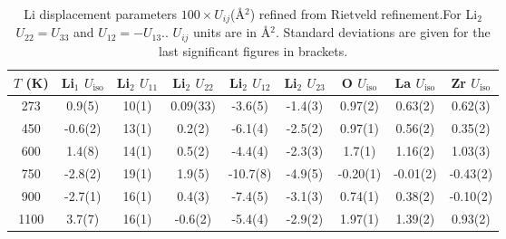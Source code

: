 \documentclass[twoside,twocolumn,9pt]{article}
\begin{document}
\begin{table}[t]
\centering
\caption{Li displacement parameters $100 \times U_{ij}$(\AA$^2$) refined from Rietveld refinement.For Li$_2$ $U_{22} = U_{33}$ and $U_{12} = - U_{13}.
$. $U_{ij}$ units are in \AA$^2$.
Standard deviations are given for the last significant figures in brackets. }
\label{tab:Li_displacement_parameters}
\begin{tabular}{ccccccccc}
\hline
\hline
$T$ (K) & Li$_1$ $U_\mathrm{iso}$  & Li$_2$ $U_{11}$ & Li$_2$ $U_{22}$ & Li$_2$ $U_{12}$ & Li$_2$ $U_{23}$  & O $U_\mathrm{iso}$  & La $U_\mathrm{iso}$  & Zr $U_\mathrm{iso}$\\
\hline
273     &  0.9(5)                  & 10(1)           & 0.09(33)        & -3.6(5)         & -1.4(3)          &  0.97(2)            &  0.63(2)             &  0.62(3)            \\
450     & -0.6(2)                  & 13(1)           & 0.2(2)          & -6.1(4)         & -2.5(2)          &  0.97(1)            &  0.56(2)             &  0.35(2)            \\
600     &  1.4(8)                  & 14(1)           & 0.5(2)          & -4.4(4)         & -2.3(3)          &  1.7(1)             &  1.16(2)             &  1.03(3)            \\
750     & -2.8(2)                  & 19(1)           & 1.9(5)          & -10.7(8)        & -4.9(5)          & -0.20(1)            & -0.01(2)             & -0.43(2)            \\
900     & -2.7(1)                  & 16(1)           & 0.4(3)          & -7.4(5)         & -3.1(3)          &  0.74(1)            &  0.38(2)             & -0.10(2)            \\
1100    &  3.7(7)                  & 16(1)           &-0.6(2)          & -5.4(4)         & -2.9(2)          &  1.97(1)            &  1.39(2)             &  0.93(2)            \\
\hline
\hline
\end{tabular}
\end{table}
\end{document}
